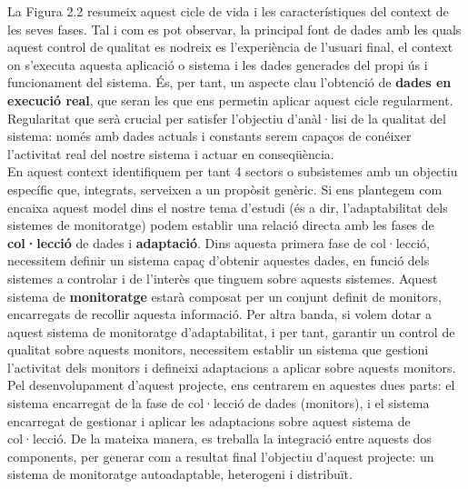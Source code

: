 La Figura 2.2 resumeix aquest cicle de vida i les característiques del context de les seves fases. Tal i com es pot observar, la principal font de dades amb les quals aquest control de qualitat es nodreix es l'experiència de l'usuari final, el context on s'executa aquesta aplicació o sistema i les dades generades del propi ús i funcionament del sistema. És, per tant, un aspecte clau l'obtenció de \textbf{dades en execució real}, que seran les que ens permetin aplicar aquest cicle regularment. Regularitat que serà crucial per satisfer l'objectiu d'anàl·lisi de la qualitat del sistema: només amb dades actuals i constants serem capaços de conéixer l'activitat real del nostre sistema i actuar en conseqüència.\\

En aquest context identifiquem per tant 4 sectors o subsistemes amb un objectiu específic que, integrats, serveixen a un propòsit genèric. Si ens plantegem com encaixa aquest model dins el nostre tema d'estudi (és a dir, l'adaptabilitat dels sistemes de monitoratge) podem establir una relació directa amb les fases de \textbf{col·lecció} de dades i \textbf{adaptació}. Dins aquesta primera fase de col·lecció, necessitem definir un sistema capaç d'obtenir aquestes dades, en funció dels sistemes a controlar i de l'interès que tinguem sobre aquests sistemes. Aquest sistema de \textbf{monitoratge} estarà composat per un conjunt definit de monitors, encarregats de recollir aquesta informació. Per altra banda, si volem dotar a aquest sistema de monitoratge d'adaptabilitat, i per tant, garantir un control de qualitat sobre aquests monitors, necessitem establir un sistema que gestioni l'activitat dels monitors i defineixi adaptacions a aplicar sobre aquests monitors.\\

Pel desenvolupament d'aquest projecte, ens centrarem en aquestes dues parts: el sistema encarregat de la fase de col·lecció de dades (monitors), i el sistema encarregat de gestionar i aplicar les adaptacions sobre aquest sistema de col·lecció. De la mateixa manera, es treballa la integració entre aquests dos components, per generar com a resultat final l'objectiu d'aquest projecte: un sistema de monitoratge autoadaptable, heterogeni i distribuït.